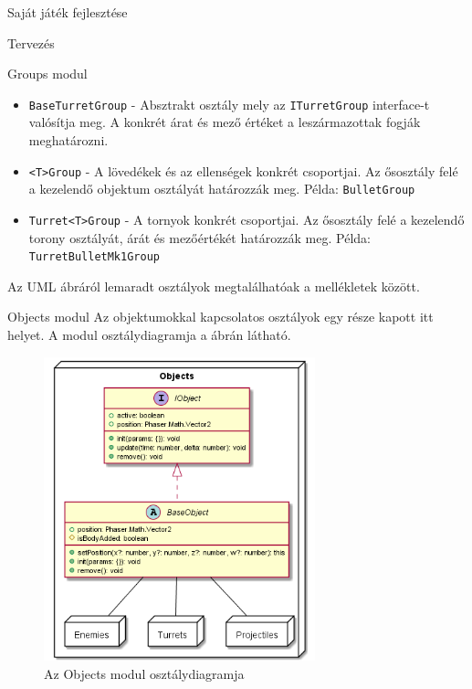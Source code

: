 \begin{MyChapter}{Saját játék fejlesztése}
\begin{MySection}{Tervezés}
\begin{MySubSection}{Groups modul}
\begin{itemize}
				\item \texttt{BaseTurretGroup} - Absztrakt osztály mely az \texttt{ITurretGroup} interface-t valósítja meg. A konkrét árat és mező értéket a leszármazottak fogják meghatározni.
				
				\item \texttt{<T>Group} - A lövedékek és az ellenségek konkrét csoportjai. Az ősosztály felé a kezelendő objektum osztályát határozzák meg. Példa: \texttt{BulletGroup}
				
				\item \texttt{Turret<T>Group} - A tornyok konkrét csoportjai. Az ősosztály felé a kezelendő torony osztályát, árát és mezőértékét határozzák meg. Példa: \texttt{Turret\-Bullet\-Mk1\-Group}
			\end{itemize}
			
			Az UML ábráról lemaradt osztályok megtalálhatóak a mellékletek között.
		\end{MySubSection}
	
		\begin{MySubSection}{Objects modul}
			Az objektumokkal kapcsolatos osztályok egy része kapott itt helyet.
			A modul osztálydiagramja a  ábrán látható.
			
			\begin{figure}[h!]
				\centering
				\includegraphics[width=0.7\textwidth]{kepek/uml/objects/object.png}
				\caption{Az Objects modul osztálydiagramja}
				\label{fig:uml:object}
			\end{figure}
			

\end{MySubSection}
\end{MySection}
\end{MyChapter}
